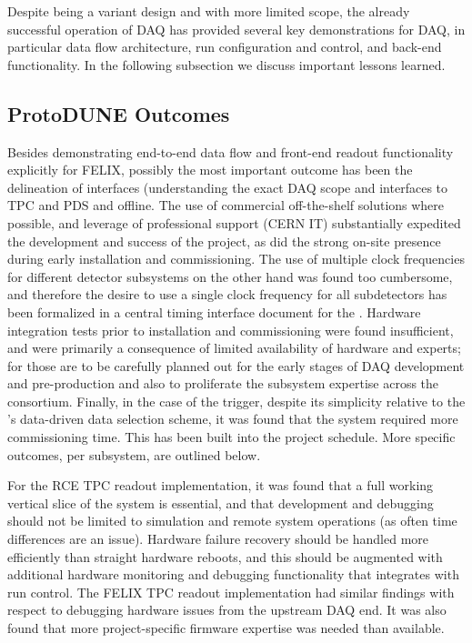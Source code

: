 Despite being a variant design and with more limited scope, the already
successful operation of  DAQ has provided several key
demonstrations for  DAQ, in particular data flow
architecture, run configuration and control, and back-end
functionality. In the following subsection we discuss important lessons learned.

\subsection{ProtoDUNE Outcomes}
Besides demonstrating end-to-end data flow and front-end readout functionality
explicitly for FELIX, possibly the most important outcome has been the delineation of
interfaces (understanding the exact DAQ scope and interfaces to TPC
and PDS and offline. The use of commercial off-the-shelf solutions
where possible, and leverage of professional support (CERN IT)
substantially expedited the development and success of the project, as
did the strong on-site presence during early installation and
commissioning. The use of multiple clock frequencies for different
detector subsystems on the other hand was found too cumbersome, and therefore the desire
to use a single clock frequency for all  subdetectors has been
formalized in a central timing interface document for the 
 \citedocdb{}. Hardware integration tests prior to
installation and commissioning were found insufficient, and were
primarily a consequence of limited
availability of hardware and experts; for  those are
to be carefully planned out for the early stages of DAQ development and
pre-production and also to proliferate the subsystem expertise across
the consortium. Finally, in the case of the  trigger, despite its simplicity
relative to the 's data-driven data selection scheme, it
was found that the system required more commissioning time. This has
been built into the  project schedule. More specific
outcomes, per  subsystem, are outlined below.

For the RCE TPC readout implementation, it was found that a full
working vertical slice of the system is essential, and that
development and debugging should not be limited to simulation and
remote system operations (as often time differences are an
issue). Hardware failure recovery should be handled more efficiently
than straight hardware reboots, and this should be augmented with additional
hardware monitoring and debugging functionality that integrates with
run control. The FELIX TPC readout implementation had similar findings with
respect to debugging hardware issues from the upstream DAQ end. It was
also found that more project-specific firmware expertise was needed
than available.

